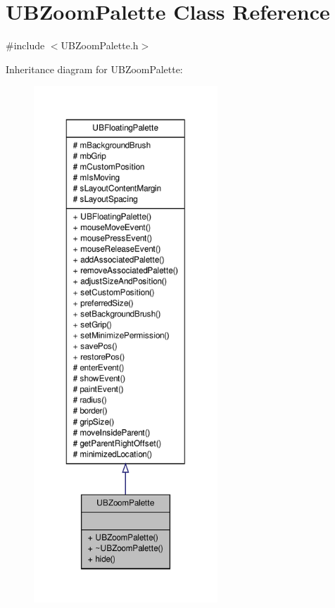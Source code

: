 \hypertarget{class_u_b_zoom_palette}{\section{U\-B\-Zoom\-Palette Class Reference}
\label{db/dbc/class_u_b_zoom_palette}
}


{\ttfamily \#include $<$U\-B\-Zoom\-Palette.\-h$>$}



Inheritance diagram for U\-B\-Zoom\-Palette\-:
\nopagebreak
\begin{figure}[H]
\begin{center}
\leavevmode
\includegraphics[height=550pt]{dd/d1e/class_u_b_zoom_palette__inherit__graph}
\end{center}
\end{figure}


